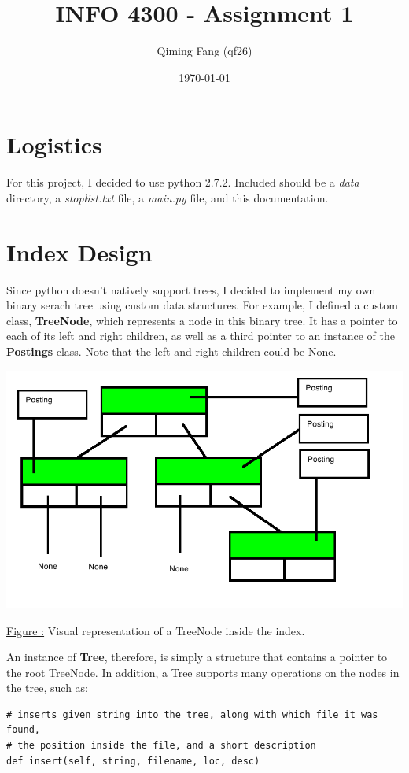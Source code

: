\documentclass[11pt]{article}
\newcounter{ctFigures}
\begin{document}
\title{\textbf {INFO 4300 - Assignment 1}}
\author{Qiming Fang (qf26)}
\date{\today}

\maketitle
\thispagestyle{fancy}
\section*{Logistics}
For this project, I decided to use python 2.7.2. Included should be a \emph{data} directory, a \emph{stoplist.txt} file, a \emph{main.py} file, and this documentation.
\section*{Index Design}
Since python doesn't natively support trees, I decided to implement my own binary serach tree using custom data structures. For example, I defined a custom class, \textbf{TreeNode}, which represents a node in this binary tree. It has a pointer to each of its left and right children, as well as a third pointer to an instance of the \textbf{Postings} class. Note that the left and right children could be None.
\begin{center}
\includegraphics[scale=0.5]{treeNode}
\begin{flushright}
\underline{Figure :} Visual representation of a TreeNode inside the index.
\addtocounter{ctFigures}{1}
\end{flushright}
\end{center}
An instance of \textbf{Tree}, therefore, is simply a structure that contains a pointer to the root TreeNode. In addition, a Tree supports many operations on the nodes in the tree, such as:
\begin{Verbatim}[frame=single]
# inserts given string into the tree, along with which file it was found,
# the position inside the file, and a short description
def insert(self, string, filename, loc, desc)
\end{Verbatim}
\end{document}
